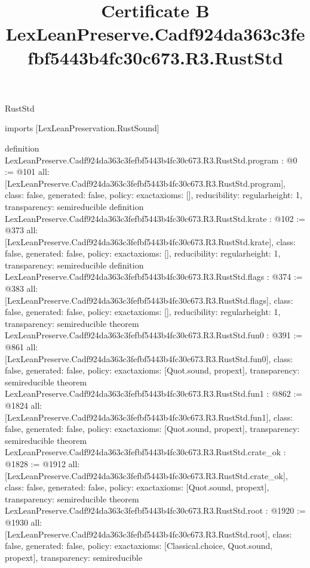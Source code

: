 \begin{lexlean}{RustStd}
\title{Certificate B LexLeanPreserve.Cadf924da363c3fefbf5443b4fc30c673.R3.RustStd}
\begin{coremodule}
imports [LexLeanPreservation.RustSound]

definition LexLeanPreserve.Cadf924da363c3fefbf5443b4fc30c673.R3.RustStd.program : @0 := @101 {
  all: [LexLeanPreserve.Cadf924da363c3fefbf5443b4fc30c673.R3.RustStd.program],
  class: false,
  generated: false,
  policy: exact{axioms: []},
  reducibility: regular{height: 1},
  transparency: semireducible
}
definition LexLeanPreserve.Cadf924da363c3fefbf5443b4fc30c673.R3.RustStd.krate : @102 := @373 {
  all: [LexLeanPreserve.Cadf924da363c3fefbf5443b4fc30c673.R3.RustStd.krate],
  class: false,
  generated: false,
  policy: exact{axioms: []},
  reducibility: regular{height: 1},
  transparency: semireducible
}
definition LexLeanPreserve.Cadf924da363c3fefbf5443b4fc30c673.R3.RustStd.flags : @374 := @383 {
  all: [LexLeanPreserve.Cadf924da363c3fefbf5443b4fc30c673.R3.RustStd.flags],
  class: false,
  generated: false,
  policy: exact{axioms: []},
  reducibility: regular{height: 1},
  transparency: semireducible
}
theorem LexLeanPreserve.Cadf924da363c3fefbf5443b4fc30c673.R3.RustStd.fun0 : @391 := @861 {
  all: [LexLeanPreserve.Cadf924da363c3fefbf5443b4fc30c673.R3.RustStd.fun0],
  class: false,
  generated: false,
  policy: exact{axioms: [Quot.sound, propext]},
  transparency: semireducible
}
theorem LexLeanPreserve.Cadf924da363c3fefbf5443b4fc30c673.R3.RustStd.fun1 : @862 := @1824 {
  all: [LexLeanPreserve.Cadf924da363c3fefbf5443b4fc30c673.R3.RustStd.fun1],
  class: false,
  generated: false,
  policy: exact{axioms: [Quot.sound, propext]},
  transparency: semireducible
}
theorem LexLeanPreserve.Cadf924da363c3fefbf5443b4fc30c673.R3.RustStd.crate_ok : @1828 := @1912 {
  all: [LexLeanPreserve.Cadf924da363c3fefbf5443b4fc30c673.R3.RustStd.crate_ok],
  class: false,
  generated: false,
  policy: exact{axioms: [Quot.sound, propext]},
  transparency: semireducible
}
theorem LexLeanPreserve.Cadf924da363c3fefbf5443b4fc30c673.R3.RustStd.root : @1920 := @1930 {
  all: [LexLeanPreserve.Cadf924da363c3fefbf5443b4fc30c673.R3.RustStd.root],
  class: false,
  generated: false,
  policy: exact{axioms: [Classical.choice, Quot.sound, propext]},
  transparency: semireducible
}


\end{coremodule}
\end{lexlean}
